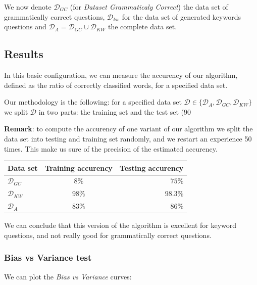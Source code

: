 We now denote $\mathcal{D}_{GC}$ (for \textit{Dataset Grammaticaly Correct}) the data set of grammatically correct questions, $\mathcal{D}_{kw}$ for the data set of generated keywords questions and $\mathcal{D}_A = \mathcal{D}_{GC} \cup  \mathcal{D}_{KW}$ the complete data set.

\subsection{Results}

In this basic configuration, we can measure the accurency of our algorithm, defined as the ratio of correctly classified words, for a specified data set.

Our methodology is the following: for a specified data set $\mathcal{D} \in \{\mathcal{D}_A, \mathcal{D}_{GC}, \mathcal{D}_{KW}\}$ we split $\mathcal{D}$ in two parts: the training set and the test set (90%

\textbf{Remark}: to compute the accurency of one variant of our algorithm we split the data set into testing and training set randomly, and we restart an experience 50 times. This make us sure of the precision of the estimated accurency.

\begin{center}
\begin{tabular}{|l|c|r|}
  \hline
  Data set & Training accurency  & Testing accurency \\
  \hline
  $\mathcal{D}_{GC}$ & $8\%$ & $75\%$ \\
  $\mathcal{D}_{KW}$ & $98\%$ & $98.3\%$ \\
  $\mathcal{D}_{A}$    & $83\%$ & $86\%$ \\
  \hline
\end{tabular}
\end{center}

We can conclude that this version of the algorithm is excellent for keyword questions, and not really good for grammatically correct questions.

\subsubsection{Bias vs Variance test}

We can plot the \textit{Bias vs Variance} curves:

